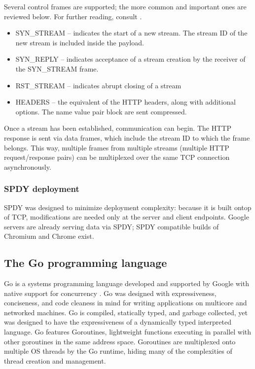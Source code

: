 \documentclass{article}
\begin{document}
Several control frames are supported; the more common and important ones are reviewed below. For further reading, consult \cite{spdy2}.
\begin{itemize}
  \item SYN\_STREAM  -- indicates the start of a new stream. The stream ID of the new stream is included inside the payload.
  \item SYN\_REPLY -- indicates acceptance of a stream creation by the receiver of the SYN\_STREAM frame.
  \item RST\_STREAM -- indicates abrupt closing of a stream
  \item HEADERS -- the equivalent of the HTTP headers, along with additional options. The name value pair block are sent compressed.
\end{itemize}

Once a stream has been established, communication can begin. The HTTP response is sent via data frames, which include the stream ID to which the frame belongs. This way, multiple frames from multiple streams (multiple HTTP request/response pairs) can be multiplexed over the same TCP connection asynchronously. 

\subsubsection{SPDY deployment}
SPDY was designed to minimize deployment complexity: because it is built ontop of TCP, modifications are needed only at the server and client endpoints. Google servers are already serving data via SPDY; SPDY compatible builds of Chromium and Chrome exist.

\subsection{The Go programming language}
Go is a systems programming language developed and supported by Google with native support for concurrency \cite{goabout}. Go was designed with expressiveness, conciseness, and code cleaness in
mind for writing applications on multicore and networked machines. Go is compiled, statically typed, and garbage collected, yet was designed to have the expressiveness of a
dynamically typed interpreted language. Go features Goroutines, lightweight functions executing in parallel with other goroutines in the same address space. 
Goroutines are multiplexed onto multiple OS threads by the Go runtime, hiding many of the complexities of thread creation and management.
\end{document}
